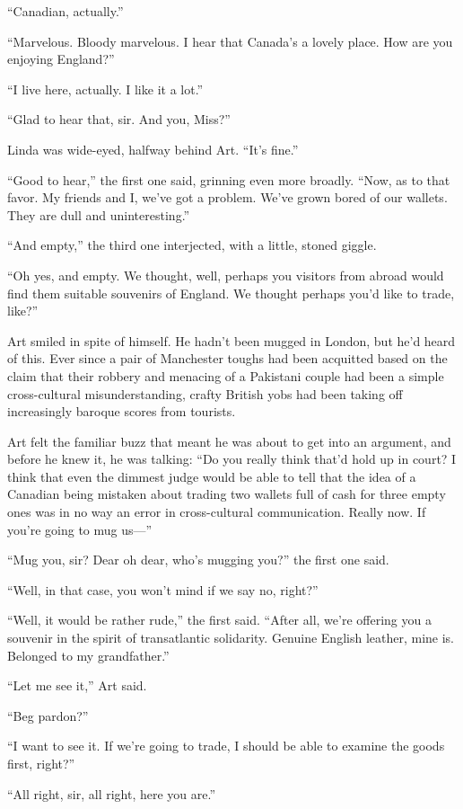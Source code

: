 “Canadian, actually.”

“Marvelous. Bloody marvelous. I hear that Canada’s a lovely place.
How are you enjoying England?”

“I live here, actually. I like it a lot.”

“Glad to hear that, sir. And you, Miss?”

Linda was wide-eyed, halfway behind Art. “It’s fine.”

“Good to hear,” the first one said, grinning even more broadly.
“Now, as to that favor. My friends and I, we’ve got a problem.
We’ve grown bored of our wallets. They are dull and
uninteresting.”

“And empty,” the third one interjected, with a little, stoned
giggle.

“Oh yes, and empty. We thought, well, perhaps you visitors from
abroad would find them suitable souvenirs of England. We thought
perhaps you’d like to trade, like?”

Art smiled in spite of himself. He hadn’t been mugged in London,
but he’d heard of this. Ever since a pair of Manchester toughs had
been acquitted based on the claim that their robbery and menacing
of a Pakistani couple had been a simple cross-cultural
misunderstanding, crafty British yobs had been taking off
increasingly baroque scores from tourists.

Art felt the familiar buzz that meant he was about to get into an
argument, and before he knew it, he was talking: “Do you really
think that’d hold up in court? I think that even the dimmest judge
would be able to tell that the idea of a Canadian being mistaken
about trading two wallets full of cash for three empty ones was in
no way an error in cross-cultural communication. Really now. If
you’re going to mug us—”

“Mug you, sir? Dear oh dear, who’s mugging you?” the first one
said.

“Well, in that case, you won’t mind if we say no, right?”

“Well, it would be rather rude,” the first said. “After all, we’re
offering you a souvenir in the spirit of transatlantic solidarity.
Genuine English leather, mine is. Belonged to my grandfather.”

“Let me see it,” Art said.

“Beg pardon?”

“I want to see it. If we’re going to trade, I should be able to
examine the goods first, right?”

“All right, sir, all right, here you are.”

